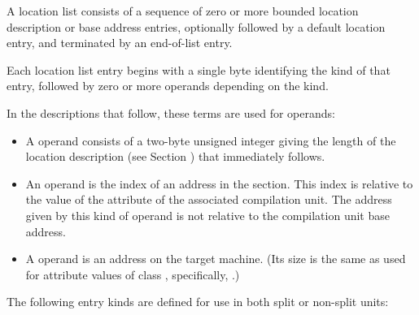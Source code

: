 A location list consists of a sequence of zero or more bounded
location description or base address entries, optionally followed
by a default location entry, and terminated by an end-of-list
entry.

Each location list entry begins with a single byte identifying
the kind of that entry, followed by zero or more operands depending
on the kind.   
   
In the descriptions that follow, these terms are used for operands:
   
\begin{itemize}
\item A  operand consists 
of a two-byte unsigned integer giving the length of the location
description (see Section ) 
that immediately follows.

\item An  operand is the index of an address
in the \dotdebugaddr{} section. This index is relative to the
value of the \DWATaddrbase{} attribute of the associated
compilation unit. The address given by this kind
of operand is not relative to the compilation unit base address.
   
\item A  operand is an address on the target
machine. (Its size is the same as used for attribute values of
class \CLASSaddress, specifically, \DWFORMaddr.)

\end{itemize}
 
The following entry kinds are defined for use in both
split or non-split units:
   
